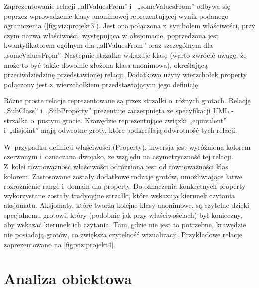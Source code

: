 Zaprezentowanie relacji „allValuesFrom” i~ „someValuesFrom”  odbywa się poprzez wprowadzenie klasy anonimowej reprezentującej wynik podanego
 ograniczenia (\figurename \space \ref{fig:viz:projekt3}). Jest ona połączona z~symbolem właściwości, przy czym nazwa właściwości, występująca w~aksjomacie, 
 poprzedzona jest kwantyfikatorem
 ogólnym dla  „allValuesFrom” oraz szczególnym dla „someValuesFrom”. Następnie strzałka wskazuje klasę (warto zwrócić uwagę, że może to być także 
dowolnie złożona klasa anonimowa), określającą przeciwdziedzinę przedstawionej relacji. Dodatkowo użyty wierzchołek property połączony jest 
z~wierzchołkiem przedstawiającym jego definicję.


Różne proste relacje reprezentowane są przez strzałki o~różnych grotach. Relację „SubClass” i~„SubProperty” prezentuje zaczerpnięta ze specyfikacji 
UML - strzałka o~pustym grocie.  Krawędzie reprezentujące związki „equivalent” i~„disjoint” mają odwrotne groty, które podkreślają odwrotność tych relacji.


 W~przypadku definicji właściwości (Property), inwersja jest wyróżniona kolorem czerwonym i~oznaczana dwojako, ze względu na asymetryczność tej relacji. Z~kolei 
równoważność właściwości odróżniona jest od równoważności klas kolorem. Zastosowane zostały dodatkowe rodzaje grotów, umożliwiające łatwe rozróżnienie 
range i~domain dla property. Do oznaczenia konkretnych property wykorzystane zostały tradycyjne strzałki, które wskazują kierunek czytania  aksjomatu.
 Aksjomaty, które tworzą kolejne klasy anonimowe, są czytelne dzięki specjalnemu grotowi, który (podobnie jak przy właściwościach) był konieczny, aby wskazać 
kierunek ich czytania. Tam, gdzie nie jest to potrzebne, krawędzie nie posiadają grotów, co zwiększa czytelność wizualizacji. Przykładowe relacje 
zaprezentowano na \figurename \space \ref{fig:viz:projekt4}.

\section{Analiza obiektowa}

